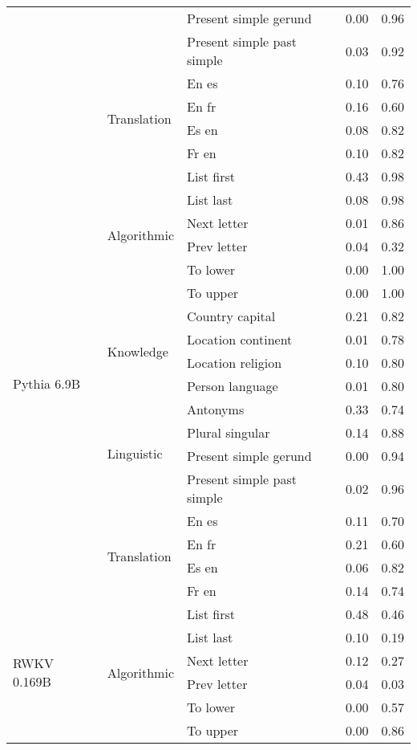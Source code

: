 \begin{center}
\begin{longtable}{lllrr}
 &  & Present simple gerund & 0.00 & 0.96 \\
 &  & Present simple past simple & 0.03 & 0.92 \\
\cline{2-5}
 & \multirow[t]{4}{*}{Translation} & En es & 0.10 & 0.76 \\
 &  & En fr & 0.16 & 0.60 \\
 &  & Es en & 0.08 & 0.82 \\
 &  & Fr en & 0.10 & 0.82 \\
\cline{1-5} \cline{2-5}
\multirow[t]{18}{*}{Pythia 6.9B} & \multirow[t]{6}{*}{Algorithmic} & List first & 0.43 & 0.98 \\
 &  & List last & 0.08 & 0.98 \\
 &  & Next letter & 0.01 & 0.86 \\
 &  & Prev letter & 0.04 & 0.32 \\
 &  & To lower & 0.00 & 1.00 \\
 &  & To upper & 0.00 & 1.00 \\
\cline{2-5}
 & \multirow[t]{4}{*}{Knowledge} & Country capital & 0.21 & 0.82 \\
 &  & Location continent & 0.01 & 0.78 \\
 &  & Location religion & 0.10 & 0.80 \\
 &  & Person language & 0.01 & 0.80 \\
\cline{2-5}
 & \multirow[t]{4}{*}{Linguistic} & Antonyms & 0.33 & 0.74 \\
 &  & Plural singular & 0.14 & 0.88 \\
 &  & Present simple gerund & 0.00 & 0.94 \\
 &  & Present simple past simple & 0.02 & 0.96 \\
\cline{2-5}
 & \multirow[t]{4}{*}{Translation} & En es & 0.11 & 0.70 \\
 &  & En fr & 0.21 & 0.60 \\
 &  & Es en & 0.06 & 0.82 \\
 &  & Fr en & 0.14 & 0.74 \\
\cline{1-5} \cline{2-5}
\multirow[t]{18}{*}{RWKV 0.169B} & \multirow[t]{6}{*}{Algorithmic} & List first & 0.48 & 0.46 \\
 &  & List last & 0.10 & 0.19 \\
 &  & Next letter & 0.12 & 0.27 \\
 &  & Prev letter & 0.04 & 0.03 \\
 &  & To lower & 0.00 & 0.57 \\
 &  & To upper & 0.00 & 0.86 \\
\cline{2-5}

\end{longtable}
\end{center}
